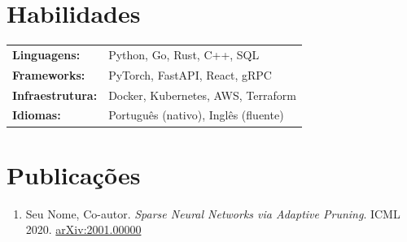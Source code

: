 \documentclass[11pt,a4paper]{article}
\begin{document}
\section{Habilidades}

\begin{tabular}{ll}
\textbf{Linguagens:}   & Python, Go, Rust, C++, SQL \\
\textbf{Frameworks:}   & PyTorch, FastAPI, React, gRPC \\
\textbf{Infraestrutura:} & Docker, Kubernetes, AWS, Terraform \\
\textbf{Idiomas:}      & Português (nativo), Inglês (fluente)
\end{tabular}

\section{Publicações}

\begin{enumerate}
  \item Seu Nome, Co-autor. \textit{Sparse Neural Networks via Adaptive Pruning}.
        ICML 2020. \href{https://arxiv.org/}{arXiv:2001.00000}
\end{enumerate}
\end{document}
